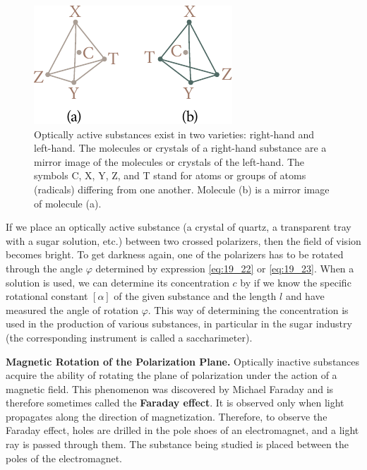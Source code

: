 \begin{figure}[t]
	\begin{center}
		\includegraphics[scale=1]{figures/ch_19/fig_19_21.pdf}
        \caption[]{Optically active substances exist in two varieties: right-hand and left-hand. The molecules or crystals of a right-hand substance are a mirror image of the molecules or crystals of the left-hand. The symbols C, X, Y, Z, and T stand for atoms or groups of atoms (radicals) differing from one another. Molecule (b) is a mirror image of molecule (a).}
		\label{fig:19_21}
	\end{center}
	\vspace{-0.8cm}
\end{figure}

If we place an optically active substance (a crystal of quartz, a transparent tray with a sugar solution, etc.) between two crossed polarizers, then the field of vision becomes bright.
To get darkness again, one of the polarizers has to be rotated through the angle $\varphi$ determined by expression \eqref{eq:19_22} or \eqref{eq:19_23}.
When a solution is used, we can determine its concentration $c$ by  if we know the specific rotational constant $[\alpha]$ of the given substance and the length $l$ and have measured the angle of rotation $\varphi$.
This way of determining the concentration is used in the production of various substances, in particular in the sugar industry (the corresponding instrument is called a saccharimeter).

\textbf{Magnetic Rotation of the Polarization Plane.}
Optically inactive substances acquire the ability of rotating the plane of polarization under the action of a magnetic field.
This phenomenon was discovered by Michael Faraday and is therefore sometimes called the \textbf{Faraday effect}.
It is observed only when light propagates along the direction of magnetization.
Therefore, to observe the Faraday effect, holes are drilled in the pole shoes of an electromagnet, and a light ray is passed through them.
The substance being studied is placed between the poles of the electromagnet.

